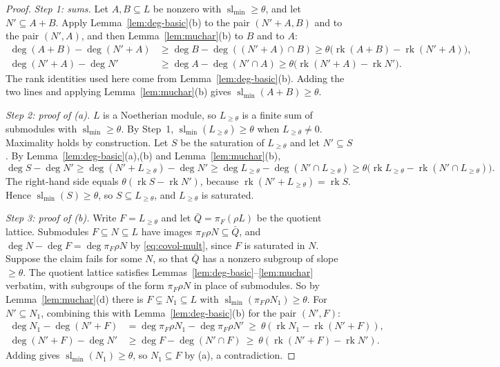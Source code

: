 \documentclass[10pt]{amsart}
\theoremstyle{definition}
\theoremstyle{remark}
\begin{document}
\begin{proof}
\emph{Step 1: sums.} Let $A,B\subseteq L$ be nonzero with $\operatorname{sl}_{\min}\ge\theta$, and let $N'\subseteq A+B$. Apply Lemma~\ref{lem:deg-basic}(b) to the pair $(N'+A,B)$ and to the pair $(N',A)$, and then Lemma~\ref{lem:muchar}(b) to $B$ and to $A$:
\begin{align*}
\deg(A+B)-\deg(N'+A)&\ge\deg B-\deg((N'+A)\cap B)\ge\theta\bigl(\operatorname{rk}(A+B)-\operatorname{rk}(N'+A)\bigr),\\
\deg(N'+A)-\deg N'&\ge\deg A-\deg(N'\cap A)\ge\theta\bigl(\operatorname{rk}(N'+A)-\operatorname{rk}N'\bigr).
\end{align*}
The rank identities used here come from Lemma~\ref{lem:deg-basic}(b). Adding the two lines and applying Lemma~\ref{lem:muchar}(b) gives $\operatorname{sl}_{\min}(A+B)\ge\theta$.

\emph{Step 2: proof of (a).} $L$ is a Noetherian module, so $L_{\ge\theta}$ is a finite sum of submodules with $\operatorname{sl}_{\min}\ge\theta$. By Step~1, $\operatorname{sl}_{\min}(L_{\ge\theta})\ge\theta$ when $L_{\ge\theta}\neq0$. Maximality holds by construction. Let $S$ be the saturation of $L_{\ge\theta}$ and let $N'\subseteq S$. By Lemma~\ref{lem:deg-basic}(a),(b) and Lemma~\ref{lem:muchar}(b),
\[
\deg S-\deg N'\ge\deg(N'+L_{\ge\theta})-\deg N'\ge\deg L_{\ge\theta}-\deg(N'\cap L_{\ge\theta})\ge\theta\bigl(\operatorname{rk}L_{\ge\theta}-\operatorname{rk}(N'\cap L_{\ge\theta})\bigr).
\]
The right-hand side equals $\theta(\operatorname{rk}S-\operatorname{rk}N')$, because $\operatorname{rk}(N'+L_{\ge\theta})=\operatorname{rk}S$. Hence $\operatorname{sl}_{\min}(S)\ge\theta$, so $S\subseteq L_{\ge\theta}$, and $L_{\ge\theta}$ is saturated.

\emph{Step 3: proof of (b).} Write $F=L_{\ge\theta}$ and let $\bar Q=\pi_F(\rho L)$ be the quotient lattice. Submodules $F\subseteq N\subseteq L$ have images $\pi_F\rho N\subseteq\bar Q$, and $\deg N-\deg F=\deg\pi_F\rho N$ by \eqref{eq:covol-mult}, since $F$ is saturated in $N$. Suppose the claim fails for some $N$, so that $\bar Q$ has a nonzero subgroup of slope $\ge\theta$. The quotient lattice satisfies Lemmas~\ref{lem:deg-basic}--\ref{lem:muchar} verbatim, with subgroups of the form $\pi_F\rho N$ in place of submodules. So by Lemma~\ref{lem:muchar}(d) there is $F\subsetneq N_1\subseteq L$ with $\operatorname{sl}_{\min}(\pi_F\rho N_1)\ge\theta$. For $N'\subseteq N_1$, combining this with Lemma~\ref{lem:deg-basic}(b) for the pair $(N',F)$:
\begin{align*}
\deg N_1-\deg(N'+F)&=\deg\pi_F\rho N_1-\deg\pi_F\rho N'\ \ge\ \theta(\operatorname{rk}N_1-\operatorname{rk}(N'+F)),\\
\deg(N'+F)-\deg N'&\ge\deg F-\deg(N'\cap F)\ \ge\ \theta(\operatorname{rk}(N'+F)-\operatorname{rk}N').
\end{align*}
Adding gives $\operatorname{sl}_{\min}(N_1)\ge\theta$, so $N_1\subseteq F$ by (a), a contradiction.


\end{proof}
\end{document}
